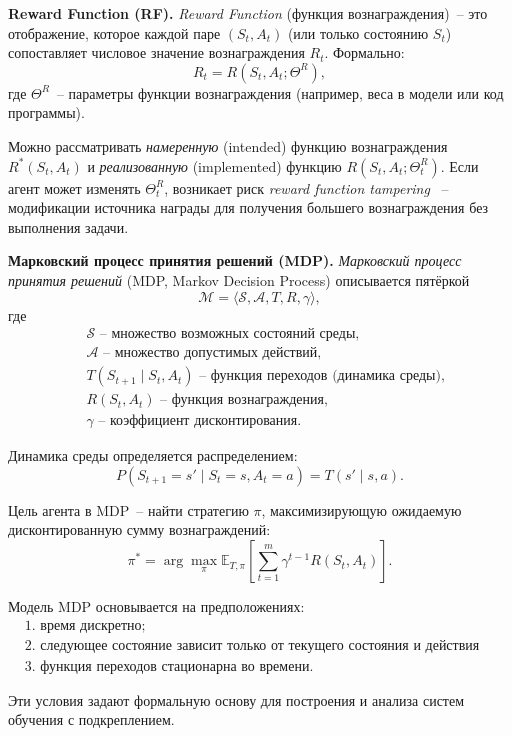 \documentclass[11pt]{extarticle}
\begin{document}
\textbf{Reward Function (RF).}
\emph{Reward Function} (функция вознаграждения)~-- это отображение, которое каждой паре $(S_t, A_t)$ (или только состоянию $S_t$) сопоставляет числовое значение вознаграждения $R_t$.  
Формально:
\begin{equation}
R_t = R(S_t, A_t; \Theta^R),
\end{equation}
где $\Theta^R$~-- параметры функции вознаграждения (например, веса в модели или код программы).  

Можно рассматривать \emph{намеренную} (intended) функцию вознаграждения $R^*(S_t, A_t)$ и \emph{реализованную} (implemented) функцию $R(S_t, A_t; \Theta_t^R)$.  
Если агент может изменять $\Theta_t^R$, возникает риск \emph{reward function tampering} ~-- модификации источника награды для получения большего вознаграждения без выполнения задачи.

\textbf{Марковский процесс принятия решений (MDP).}
\emph{Марковский процесс принятия решений} (MDP, Markov Decision Process) описывается пятёркой
\begin{equation}
\mathcal{M} = \langle \mathcal{S}, \mathcal{A}, T, R, \gamma \rangle,
\end{equation}
где
\begin{equation*}
\begin{aligned}
& \mathcal{S}\text{~-- множество возможных состояний среды,}\\
&\mathcal{A} \text{~-- множество допустимых действий,}\\
&T(S_{t+1} \mid S_t, A_t) \text{~-- функция переходов (динамика среды),}\\
&R(S_t, A_t) \text{~-- функция вознаграждения,}\\
&\gamma \text{~-- коэффициент дисконтирования.}
\end{aligned}
\end{equation*}

Динамика среды определяется распределением:
\begin{equation}
P(S_{t+1} = s' \mid S_t = s, A_t = a) = T(s' \mid s, a).
\end{equation}

Цель агента в MDP~-- найти стратегию $\pi$, максимизирующую ожидаемую дисконтированную сумму вознаграждений:
\begin{equation}
\pi^* = \arg\max_{\pi} \mathbb{E}_{T,\pi}\!\left[\sum_{t=1}^{m} \gamma^{t-1} R(S_t, A_t)\right].
\end{equation}

Модель MDP основывается на предположениях:
\begin{equation*}
\begin{aligned}
&\text{1. время дискретно;} \\
&\text{2. следующее состояние зависит только от текущего состояния и действия (свойство Маркова);} \\
&\text{3. функция переходов стационарна во времени.}
\end{aligned}
\end{equation*}

Эти условия задают формальную основу для построения и анализа систем обучения с подкреплением.
\end{document}
